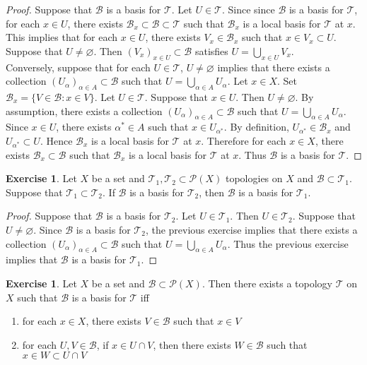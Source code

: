 \documentclass[12pt]{amsart}
\theoremstyle{definition}
\newtheorem{ex}[definition]{Exercise}
\newcommand{\al}{\alpha}
\newcommand{\MB}{\mathcal{B}}
\newcommand{\MP}{\mathcal{P}}
\newcommand{\MT}{\mathcal{T}}
\newcommand{\lex}[1]{\label{ex:#1}}
\begin{document}
	\begin{proof}
	Suppose that $\MB$ is a basis for $\MT$. Let $U \in \MT$. Since since $\MB$ is a basis for $\MT$, for each $x \in U$, there exists $\MB_x \subset \MB \subset \MT$ such that $\MB_x$ is a local basis for $\MT$ at $x$. This implies that for each $x \in U$, there exists $V_x \in \MB_x$ such that $x \in V_x \subset U$. Suppose that $U \neq \varnothing$. Then $(V_x)_{x \in U} \subset \MB$ satisfies $U = \bigcup\limits_{x \in U} V_x$. \\
	Conversely, suppose that for each $U \in \MT$, $U \neq \varnothing$ implies that there exists a collection $(U_{\al})_{\al \in A} \subset \MB$ such that $U = \bigcup\limits_{\al \in A} U_{\al}$. Let $x \in X$. Set $\MB_x = \{V \in \MB:x \in V\}$. Let $U \in \MT$. Suppose that $x \in U$. Then $U \neq \varnothing$. By assumption, there exists a collection $(U_{\al})_{\al \in A} \subset \MB$ such that $U = \bigcup\limits_{\al \in A} U_{\al}$. Since $x \in U$, there exists $\al^* \in A$ such that $x \in U_{\al^*}$. By definition, $U_{\al^*} \in \MB_x$ and $U_{\al^*} \subset U$. Hence $\MB_x$ is a local basis for $\MT$ at $x$. Therefore for each $x \in X$, there exists $\MB_x \subset \MB$ such that $\MB_x$ is a local basis for $\MT$ at $x$. Thus $\MB$ is a basis for $\MT$.
	\end{proof}
	
	\begin{ex} \lex{31008.1}
	Let $X$ be a set and $\MT_1, \MT_2 \subset \MP(X)$ topologies on $X$ and $\MB \subset \MT_1$. Suppose that $\MT_1 \subset \MT_2$. If $\MB$ is a basis for $\MT_2$, then $\MB$ is a basis for $\MT_1$.  
	\end{ex}
	
	\begin{proof}
	Suppose that $\MB$ is a basis for $\MT_2$. Let $U \in \MT_1$. Then $U \in \MT_2$. Suppose that $U \neq \varnothing$. Since $\MB$ is a basis for $\MT_2$, the previous exercise implies that there exists a collection $(U_{\al})_{\al \in A} \subset \MB$ such that $U = \bigcup\limits_{\al \in A} U_{\al}$. Thus the previous exercise implies that $\MB$ is a basis for $\MT_1$. 
	\end{proof}
	
	\begin{ex} \lex{31009}
	Let $X$ be a set and $\MB \subset \MP(X)$. Then there exists a topology $\MT$ on $X$ such that $\MB$ is a basis for $\MT$ iff 
	\begin{enumerate}
	\item for each $x \in X$, there exists $V \in \MB$ such that $x \in V$
	\item for each $U, V \in \MB$, if $x \in U \cap V$, then there exists $W \in \MB$ such that $x \in W \subset U \cap V$
	\end{enumerate}
	\end{ex}
	
\end{document}

